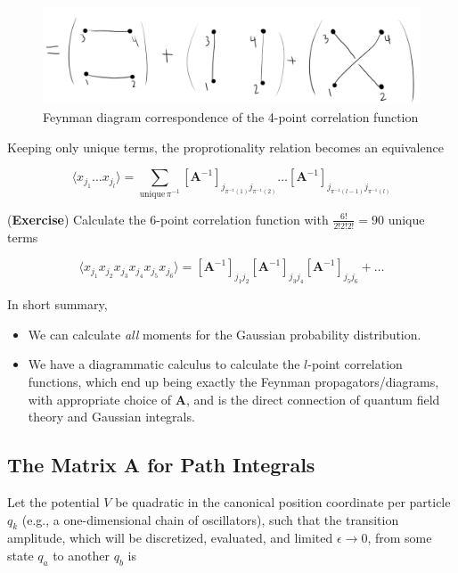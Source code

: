 \begin{figure}[H]
	\centering
	\includegraphics[scale=0.5]{images/feynman4point.png}
	\caption{Feynman diagram correspondence  of the 4-point correlation function}
\end{figure}

\noindent Keeping only unique terms, the proprotionality relation becomes an equivalence

\begin{equation}
\langle x_{j_1} \dots x_{j_l} \rangle  = \sum_{\text{unique} \,\pi^{-1}} [\textbf{A}^{-1}]_{ j_{\pi^{-1}(1)}j_{\pi^{-1}(2)}} \dots [\textbf{A}^{-1}]_{j_{\pi^{-1}(l-1)}j_{\pi^{-1}(l)}} 
\end{equation}

\noindent (\textbf{Exercise}) Calculate the 6-point correlation function with $\frac{6!}{2! 2! 2!} = 90$ unique terms

\begin{equation}
\langle x_{j_1} x_{j_2} x_{j_3} x_{j_4} x_{j_5} x_{j_6} \rangle = [\textbf{A}^{-1}]_{j_1 j_2} [\textbf{A}^{-1}]_{j_3 j_4}  [\textbf{A}^{-1}]_{j_5 j_6} + \dots
\end{equation}

\noindent In short summary,

\begin{itemize}
\item We can calculate \textit{all} moments for the Gaussian probability distribution.
\item We have a diagrammatic calculus to calculate the $l$-point correlation functions, which end up being exactly the Feynman propagators/diagrams, with appropriate choice of $\textbf{A}$, and is the direct connection of quantum field theory and Gaussian integrals.
\end{itemize}

\subsection*{The Matrix \textbf{A} for Path Integrals}

\noindent Let the potential $V$ be quadratic in the canonical position coordinate per particle $q_k$ (e.g., a one-dimensional chain of oscillators), such that the transition amplitude, which will be discretized, evaluated, and limited $\epsilon \rightarrow 0$, from some state $q_a$ to another $q_b$ is

